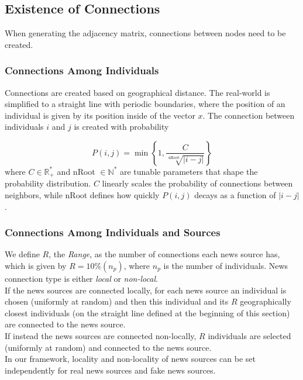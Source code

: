 \subsection{Existence of Connections}
\label{subsec:connections_existence}
When generating the adjacency matrix, connections between nodes need to be created.
\subsubsection{Connections Among Individuals}
\label{subsub: connections}
Connections are created based on geographical distance. The real-world is simplified to a straight line with periodic boundaries, where the position of an individual is given by its position inside of the vector $x$. The connection between individuals $i$ and $j$ is created with probability 


\begin{equation}
P(i,j) = \min\left\lbrace 1,\frac{C}{\sqrt[\text{nRoot}]{\vert i-j\vert}}\right\rbrace
\end{equation}
where $C\in \mathbb{R}^*_+$ and nRoot $\in \mathbb{N}^*$ are tunable parameters that shape the probability distribution. $C$ linearly scales the probability of connections between neighbors, while $\text{nRoot}$ defines how quickly $P(i,j)$ decays as a function of $\vert i-j \vert$.

\subsubsection{Connections Among Individuals and Sources}
We define $R$, the \textit{Range}, as the number of connections each news source has, which is given by $R= 10\% (n_p)$, where $n_p$ is the number of individuals.
News connection type is either \textit{local} or \textit{non-local}. 
\\If the news sources are connected locally, for each news source an individual is chosen (uniformly at random) and then this individual and its $R$ geographically closest individuals (on the straight line defined at the beginning of this section) are connected to the news source.
\\If instead the news sources are connected non-locally, $R$ individuals are selected (uniformly at random) and connected to the news source.
\\In our framework, locality and non-locality of news sources can be set independently for real news sources and fake news sources.




